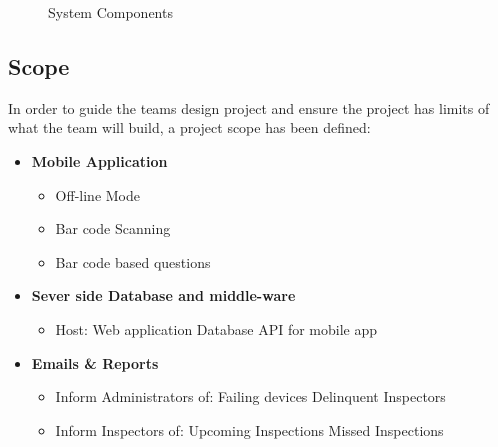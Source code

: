 \documentclass[Letter,11pt]{article}
\begin{document}
	\begin{figure}[h]
		\centering
		
		\caption{\label{sysConn} System Components}
	\end{figure}
	
	\subsection{Scope}\label{scope}
	In order to guide the teams design project and ensure the project has limits of what the team will build, a project scope has been defined:
	\\
	\begin{minipage}[t]{0.5\textwidth}
		\begin{itemize}
			\item \textbf{Mobile Application}
			\begin{itemize}
				\item Off-line Mode
				\item Bar code Scanning
				\item Bar code based questions
			\end{itemize}
			\item \textbf{Sever side Database and middle-ware}
			\begin{itemize}
				\item Host:
					\subitem Web application
					\subitem Database API for mobile app
			\end{itemize}
			\item\textbf{ Emails \& Reports}
			\begin{itemize}
				\item Inform Administrators of:
					\subitem Failing devices
					\subitem Delinquent Inspectors
				\item Inform Inspectors of:
					\subitem Upcoming Inspections
					\subitem Missed Inspections
			\end{itemize}
		\end{itemize}
	\end{minipage}
\end{document}
